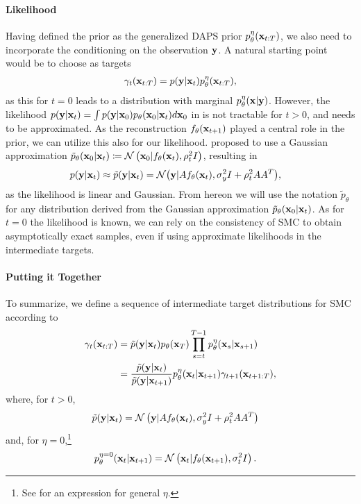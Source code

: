 \documentclass{proc}
\begin{document}
\paragraph{Likelihood}
Having defined the prior as the generalized DAPS prior $p_\theta^\eta(\mathbf{x}_{t:T})$, we also need to incorporate the conditioning on the observation $\mathbf{y}$. 
A natural starting point would be to choose as targets
\begin{align}
    \gamma_t(\mathbf{x}_{t:T}) = p(\mathbf{y}|\mathbf{x}_{t})p_\theta^\eta(\mathbf{x}_{t:T}) \label{eq:smc_ideal_target},
\end{align}
as this for $t=0$ leads to a distribution with marginal $p_\theta^\eta(\mathbf{x}|\mathbf{y})$. However, the likelihood $p(\mathbf{y}|\mathbf{x}_{t}) = \int p(\mathbf{y}|\mathbf{x}_0) p_\theta(\mathbf{x}_0|\mathbf{x}_{t})d\mathbf{x}_0$ in  is not tractable for $t>0$, and needs to be approximated. As the reconstruction $f_\theta(\mathbf{x}_{t+1})$ played a central role in the prior, we can utilize this also for our likelihood. \citet{song2023pseudoinverseguided} proposed to use a Gaussian approximation $\tilde p_\theta(\mathbf{x}_0|\mathbf{x}_{t}) \coloneqq \mathcal{N} \left(\mathbf{x}_0|f_\theta(\mathbf{x}_{t}), \rho_t^2I\right)$, resulting in
\begin{align}
p(\mathbf{y}|\mathbf{x}_{t}) 
&\approx \tilde p(\mathbf{y}|\mathbf{x}_{t})
=\mathcal{N}\bigl(\mathbf{y}|Af_\theta(\mathbf{x}_{t}), \sigma_y^2 I + \rho_t^2 AA^T\bigr), \label{eq:tilde_likelihood}
\end{align}
as the likelihood is linear and Gaussian. From hereon we will use the notation $\tilde p_\theta$ for any distribution derived from the Gaussian approximation $\tilde p_\theta(\mathbf{x}_0|\mathbf{x}_{t})$. As for $t=0$ the likelihood is known, we can rely on the consistency of SMC to obtain asymptotically exact samples, even if using approximate likelihoods in the intermediate targets.

\paragraph{Putting it Together}
To summarize, we define a sequence of intermediate target distributions for SMC according to
\begin{align}
    \gamma_t(\mathbf{x}_{t:T}) 
    &= \tilde p(\mathbf{y}|\mathbf{x}_{t}) p_\theta(\mathbf{x}_T)\prod_{s=t}^{T-1} p^\eta_\theta(\mathbf{x}_s|\mathbf{x}_{s+1}) \nonumber \\
    &= \frac{\tilde p(\mathbf{y}|\mathbf{x}_{t})}{\tilde p(\mathbf{y}|\mathbf{x}_{t+1})} p_\theta^\eta(\mathbf{x}_{t}|\mathbf{x}_{t+1})\gamma_{t+1}(\mathbf{x}_{t+1:T}),
\end{align}
where, for $t>0$,
\begin{align}
    \tilde p(\mathbf{y}|\mathbf{x}_{t}) 
    &= \mathcal{N}\left(\mathbf{y}|Af_\theta(\mathbf{x}_{t}), \sigma_y^2 I + \rho_t^2 AA^T\right) \label{eq:ddsmc_likelihood}
\end{align}
and, for $\eta=0$,\footnote{See  for an expression for general $\eta$.}
\begin{align}
    p_\theta^{\eta=0}(\mathbf{x}_{t}|\mathbf{x}_{t+1}) 
    &= \mathcal{N}\left(\mathbf{x}_{t}|f_\theta(\mathbf{x}_{t+1}),
    \sigma^2_t I\right).
    \label{eq:ddsmc_target_transition}
\end{align}
\end{document}
